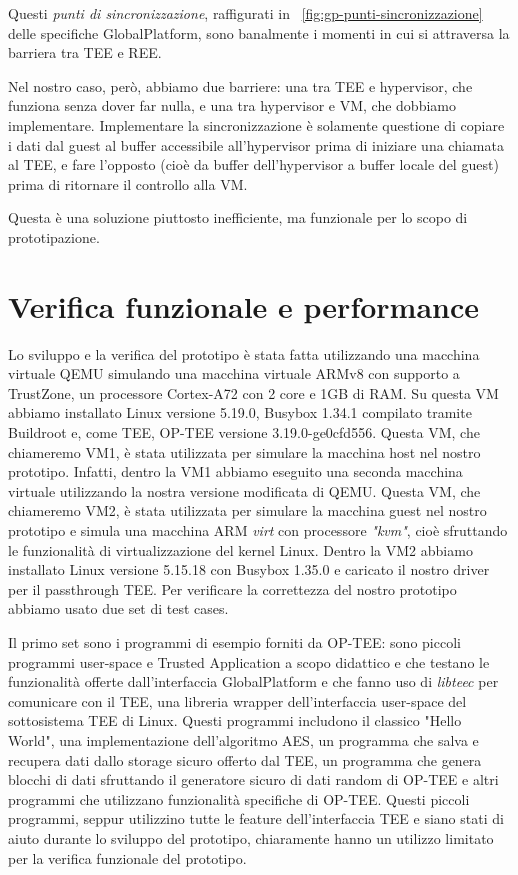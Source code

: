 \documentclass[12pt,italian]{report}
\begin{document}
Questi \textit{punti di sincronizzazione}, raffigurati in
\figurename~\ref{fig:gp-punti-sincronizzazione} delle specifiche GlobalPlatform,
sono banalmente i momenti in cui si attraversa la barriera tra TEE e REE.

Nel nostro caso, però, abbiamo due barriere: una tra TEE e hypervisor,
che funziona
senza dover far nulla, e una tra hypervisor e VM, che dobbiamo implementare.
Implementare la sincronizzazione è solamente questione di copiare i dati dal
guest al buffer accessibile all'hypervisor prima di iniziare una chiamata
al TEE, e fare l'opposto (cioè da buffer dell'hypervisor a buffer locale
del guest) prima di ritornare il controllo alla VM.

Questa è una soluzione piuttosto inefficiente, ma funzionale per lo scopo di
prototipazione.

\section{Verifica funzionale e performance}
\label{sec:verifica-funzionale-e-performance}
Lo sviluppo e la verifica del prototipo è stata fatta utilizzando una macchina
virtuale QEMU simulando una macchina virtuale ARMv8 con supporto a TrustZone,
un processore Cortex-A72 con 2 core e 1GB di RAM.
Su questa VM abbiamo installato Linux versione 5.19.0,
Busybox 1.34.1 compilato tramite Buildroot e, come TEE, OP-TEE versione
3.19.0-ge0cfd556.
Questa VM, che chiameremo VM1, è stata utilizzata per simulare la macchina
host nel nostro prototipo. Infatti, dentro la VM1 abbiamo eseguito una
seconda macchina virtuale utilizzando la nostra versione modificata di QEMU.
Questa VM, che chiameremo VM2, è stata utilizzata per simulare la macchina
guest nel nostro prototipo e simula una macchina ARM \textit{virt} con
processore \textit{"kvm"}, cioè sfruttando le funzionalità di virtualizzazione
del kernel Linux.
Dentro la VM2 abbiamo installato Linux versione 5.15.18 con Busybox 1.35.0
e caricato il nostro driver per il passthrough TEE.
Per verificare la correttezza del nostro prototipo abbiamo usato due set di
test cases.

Il primo set sono i programmi di esempio forniti da OP-TEE: sono piccoli
programmi user-space e Trusted Application a scopo didattico e che testano le
funzionalità offerte dall'interfaccia GlobalPlatform e che fanno uso di
\textit{libteec} per comunicare con il TEE, una libreria wrapper
dell'interfaccia user-space del sottosistema TEE di Linux.
Questi programmi includono il classico "Hello World", una implementazione
dell'algoritmo AES, un programma che salva e recupera dati dallo storage
sicuro offerto dal TEE, un programma che genera blocchi di dati
sfruttando il generatore sicuro di dati random di OP-TEE e altri
programmi che utilizzano funzionalità specifiche di OP-TEE.
Questi piccoli programmi, seppur utilizzino tutte le feature dell'interfaccia
TEE e siano stati di aiuto durante lo sviluppo del prototipo, chiaramente
hanno un utilizzo limitato per la verifica funzionale del prototipo.
\end{document}
